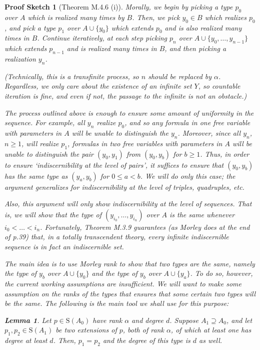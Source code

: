 \documentclass{article}
\newtheorem{lemma}[theorem]{Lemma}
\theoremstyle{nonumberplain}
\newtheorem{sketch}{Proof Sketch}
\newcommand{\Stone}{\mathrm{S}}
\begin{document}
\begin{sketch}[Theorem M.4.6 (i)]
Morally, we begin by picking a type $p_0$ over $A$ which is realized many times by $B$. Then, we pick $y_0 \in B$ which realizes $p_0$, and pick a type $p_1$ over $A \cup \{y_0\}$ which extends $p_0$ and is also realized many times in $B$. Continue iteratively, at each step picking $p_n$ over $A \cup \{y_0, \dots, y_{n-1}\}$ which extends $p_{n-1}$ and is realized many times in $B$, and then picking a realization $y_n$.

(Technically, this is a transfinite process, so $n$ should be replaced by $\alpha$. Regardless, we only care about the existence of an infinite set $Y$, so countable iteration is fine, and even if not, the passage to the infinite is not an obstacle.)

The process outlined above is enough to ensure some amount of uniformity in the sequence. For example, all $y_n$ realize $p_0$, and so any formula in one free variable with parameters in $A$ will be unable to distinguish the $y_n$. Moreover, since all $y_n$, $n \geq 1$, will realize $p_1$, formulas in two free variables with parameters in $A$ will be unable to distinguish the pair $(y_0, y_1)$ from $(y_0, y_b)$ for $b \geq 1$. Thus, in order to ensure `indiscernibility at the level of pairs', it suffices to ensure that $(y_0, y_b)$ has the same type as $(y_a, y_b)$  for $0 \leq a < b$. We will do only this case; the argument generalizes for indiscernibility at the level of triples, quadruples, etc.

Also, this argument will only show indiscernibility at the level of sequences. That is, we will show that the type of $(y_{i_0}, \dots, y_{i_n})$ over $A$ is the same whenever $i_0 < \dots < i_n$. Fortunately, Theorem M.3.9 guarantees (as Morley does at the end of p.39) that, in a totally transcendent theory, every infinite indiscernible sequence is in fact an indiscernible set.

\smallskip

The main idea is to use Morley rank to show that two types are the same, namely the type of $y_b$ over $A \cup \{y_0\}$ and the type of $y_b$ over $A \cup \{y_a\}$. To do so, however, the current working assumptions are insufficient. We will want to make some assumption on the ranks of the types that ensures that some certain two types will be the same. The following is the main tool we shall use for this purpose:

\begin{lemma}\label{lem:degunique}
Let $p \in \Stone(A_0)$ have rank $\alpha$ and degree $d$. Suppose $A_1 \supseteq A_0$, and let $p_1, p_2 \in \Stone(A_1)$ be two extensions of $p$, both of rank $\alpha$, of which at least one has degree at least $d$. Then, $p_1 = p_2$ and the degree of this type is $d$ as well.
\end{lemma}


\end{sketch}
\end{document}
